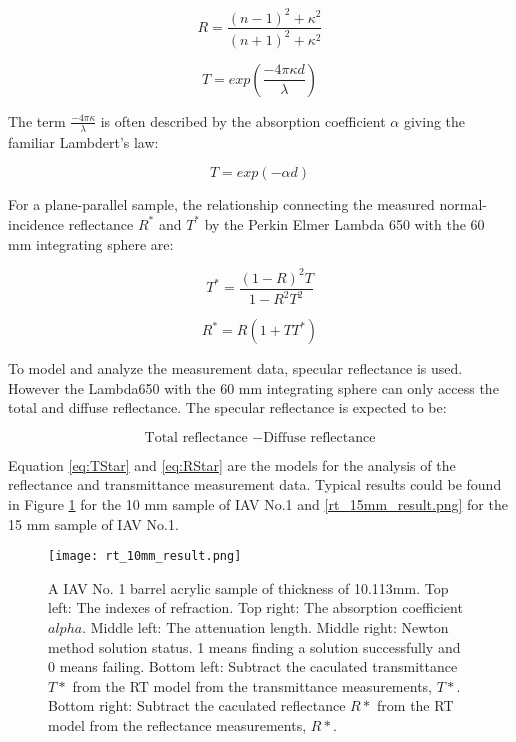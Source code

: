 \begin{equation}
\label{eq:FSR}
R = \frac{(n-1)^2 + \kappa^2}{(n+1)^2 + \kappa^2}
\end{equation}


\begin{equation}
\label{eq:IT}
T = exp(\frac{-4{\pi}{\kappa}d}{\lambda})
\end{equation}

The term $\frac{-4{\pi}{\kappa}}{\lambda}$ is often described by the absorption coefficient $\alpha$ giving the familiar Lambdert's law:

\begin{equation}
\label{eq:Lambdert}
T = exp(-{\alpha}d)
\end{equation}

For a plane-parallel sample, the relationship connecting the measured normal-incidence reflectance $R^*$ and $T^*$ by the
Perkin Elmer Lambda 650 with the 60 mm integrating sphere are:


\begin{equation}
\label{eq:TStar}
T^* = \frac{(1-R)^2T}{1-R^2T^2}
\end{equation}


\begin{equation}
\label{eq:RStar}
R^* = R(1+TT^*)
\end{equation}


To model and analyze the measurement data, specular reflectance is used.
However the Lambda650 with the 60 mm integrating sphere can only access the total and diffuse reflectance.
The specular reflectance is expected to be:

\begin{equation}
\label{eq:specularR}
\mbox{Total reflectance } - \mbox{Diffuse reflectance}
\end{equation}

Equation \ref{eq:TStar} and \ref{eq:RStar} are the models for the analysis of the reflectance and transmittance measurement data.
Typical results could be found in Figure \ref{fig:rt_10mm_result.png} for the 10 mm sample of IAV No.1
and \ref{rt_15mm_result.png} for the 15 mm sample of IAV No.1.


\begin{figure}[p]
    \centering
    \texttt{[image: rt\_10mm\_result.png]}
    \caption[Result of RT method of 10 mm acrylic sample]
{A IAV No. 1 barrel acrylic sample of thickness of 10.113mm.
Top left: The indexes of refraction.
Top right: The absorption coefficient $alpha$.
Middle left: The attenuation length.
Middle right: Newton method solution status. 1 means finding a solution successfully and 0 means failing.
Bottom left: Subtract the caculated transmittance $T*$ from the RT model from the transmittance measurements, $T*$.
Bottom right: Subtract the caculated reflectance $R*$ from the RT model from the reflectance measurements, $R*$.
}
    \label{fig:rt_10mm_result.png}
    \end{figure}


